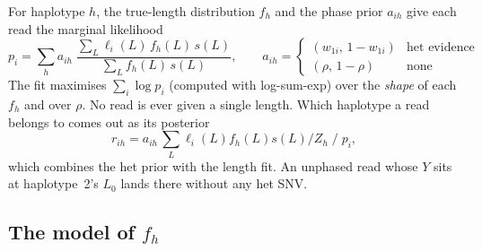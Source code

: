 \documentclass[10pt,a4paper]{article}
\begin{document}
For haplotype $h$, the true-length distribution $f_h$ and the phase prior $a_{ih}$ give each read the marginal
likelihood
\[
p_i=\sum_h a_{ih}\;\frac{\sum_L \ell_i(L)\,f_h(L)\,s(L)}{\sum_L f_h(L)\,s(L)},\qquad
a_{ih}=\begin{cases}(w_{1i},\,1-w_{1i})&\text{het evidence}\\(\rho,\,1-\rho)&\text{none}\end{cases}
\]
The fit maximises $\sum_i\log p_i$ (computed with log-sum-exp) over the \emph{shape} of each $f_h$ and over $\rho$.
No read is ever given a single length. Which haplotype a read belongs to comes out as its posterior
\[
r_{ih}=a_{ih}\,\textstyle\sum_L\ell_i(L)f_h(L)s(L)/Z_h\;\big/\;p_i ,
\]
which combines the het prior with the length fit. An unphased read whose $Y$ sits at haplotype~2's $L_0$ lands
there without any het SNV.

\subsection{The model of $f_h$}
\end{document}
